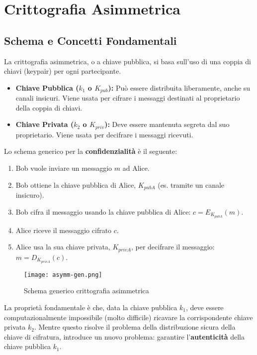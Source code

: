\documentclass[../main.tex]{subfiles}
\begin{document}
 \section{Crittografia Asimmetrica}
\label{sec:crittografia-asimmetrica}

\subsection{Schema e Concetti Fondamentali}
La crittografia asimmetrica, o a chiave pubblica, si basa sull'uso di una coppia di chiavi (keypair) per ogni partecipante.
\begin{itemize}
    \item \textbf{Chiave Pubblica ($k_1$ o $K_{pub}$):} Può essere distribuita liberamente, anche su canali insicuri. Viene usata per cifrare i messaggi destinati al proprietario della coppia di chiavi.
    \item \textbf{Chiave Privata ($k_2$ o $K_{priv}$):} Deve essere mantenuta segreta dal suo proprietario. Viene usata per decifrare i messaggi ricevuti.
\end{itemize}

Lo schema generico per la \textbf{confidenzialità} è il seguente:
\begin{enumerate}
    \item Bob vuole inviare un messaggio $m$ ad Alice.
    \item Bob ottiene la chiave pubblica di Alice, $K_{pubA}$ (es. tramite un canale insicuro).
    \item Bob cifra il messaggio usando la chiave pubblica di Alice: $c = E_{K_{pubA}}(m)$.
    \item Alice riceve il messaggio cifrato $c$.
    \item Alice usa la sua chiave privata, $K_{privA}$, per decifrare il messaggio: $m = D_{K_{privA}}(c)$.
\end{enumerate}

\begin{figure}[H]
  \centering
  \texttt{[image: asymm-gen.png]}
  \caption{Schema generico crittografia asimmetrica}
  \label{fig:}
\end{figure}

La proprietà fondamentale è che, data la chiave pubblica $k_1$, deve essere computazionalmente impossibile (molto difficile) ricavare la corrispondente chiave privata $k_2$.
Mentre questo risolve il problema della distribuzione sicura della chiave di cifratura, introduce un nuovo problema: garantire l'\textbf{autenticità} della chiave pubblica $k_1$.
\end{document}
